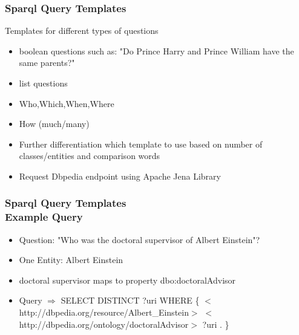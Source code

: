 \documentclass{beamer}
\newcommand\tab[1][1cm]{\hspace*{#1}}
\begin{document}
\begin{frame}
\frametitle{Sparql Query Templates}
\begin{block}{Templates for different types of questions}
	\begin{itemize}
		\item boolean questions such as: "Do Prince Harry and Prince William have the same parents?"
		\item list questions
		\item Who,Which,When,Where 
		\item How (much/many)
	\end{itemize}
\end{block}
\begin{itemize}
	\item Further differentiation which template to use based on number of classes/entities and comparison words
	\item Request Dbpedia endpoint using Apache Jena Library 
\end{itemize}
\end{frame}



\begin{frame}
\frametitle{Sparql Query Templates \\ {\normalsize Example Query}}
\begin{example}
	\begin{itemize}
		\item Question: "Who was the doctoral supervisor of Albert Einstein"?
		\item One Entity: Albert Einstein
		\item doctoral supervisor maps to property dbo:doctoralAdvisor  
		\item[] Query $\Rightarrow$ SELECT DISTINCT ?uri WHERE \{  
		\tab[1.4cm] $<$http://dbpedia.org/resource/Albert\_Einstein$>$ 
		\tab[1.4cm] $<$http://dbpedia.org/ontology/doctoralAdvisor$>$ ?uri . \}
	\end{itemize}
\end{example}
\end{frame}
\end{document}
